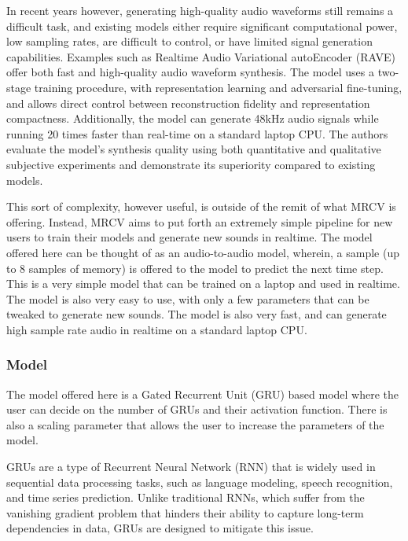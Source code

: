 \documentclass{article}
\begin{document}
In recent years however, generating high-quality audio waveforms still remains a difficult task, and existing models either require significant computational power, low sampling rates, are difficult to control, or have limited signal generation capabilities. Examples such as Realtime Audio Variational autoEncoder (RAVE) \citep{caillon2021rave} offer both fast and high-quality audio waveform synthesis. The model uses a two-stage training procedure, with representation learning and adversarial fine-tuning, and allows direct control between reconstruction fidelity and representation compactness. Additionally, the model can generate 48kHz audio signals while running 20 times faster than real-time on a standard laptop CPU. The authors evaluate the model's synthesis quality using both quantitative and qualitative subjective experiments and demonstrate its superiority compared to existing models.

This sort of complexity, however useful, is outside of the remit of what MRCV is offering. Instead, MRCV aims to put forth an extremely simple pipeline for new users to train their models and generate new sounds in realtime. The model offered here can be thought of as an audio-to-audio model, wherein, a sample (up to 8 samples of memory) is offered to the model to predict the next time step. This is a very simple model that can be trained on a laptop and used in realtime. The model is also very easy to use, with only a few parameters that can be tweaked to generate new sounds. The model is also very fast, and can generate high sample rate audio in realtime on a standard laptop CPU.

\subsubsection{Model}
The model offered here is a Gated Recurrent Unit (GRU) based model where the user can decide on the number of GRUs and their activation function. There is also a scaling parameter that allows the user to increase the parameters of the model.

GRUs are a type of Recurrent Neural Network (RNN) that is widely used in sequential data processing tasks, such as language modeling, speech recognition, and time series prediction. Unlike traditional RNNs, which suffer from the vanishing gradient problem \citep{hochreiter1998vanishing} that hinders their ability to capture long-term dependencies in data, GRUs are designed to mitigate this issue.
\end{document}
